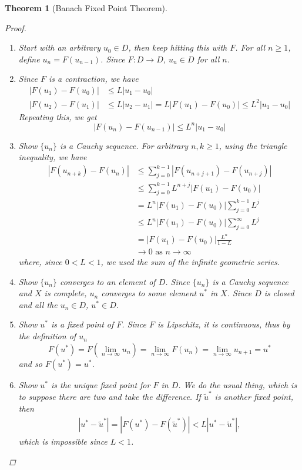 \documentclass{article}
\newtheorem{theorem}{Theorem}[section]
\begin{document}
\begin{theorem}[Banach Fixed Point Theorem]
\begin{proof}
\begin{enumerate}
	\item Start with an arbitrary $u_0 \in D$, then keep hitting this with $F$. For all $n \geq 1$, define $u_n = F(u_{n-1})$. Since $F: D \rightarrow D$, $u_n \in D$ for all $n$.
	\item Since $F$ is a contraction, we have
	\begin{align*}
	|F(u_1) - F(u_0)| &\leq L |u_1 - u_0| \\
	|F(u_2) - F(u_1)| &\leq L |u_2 - u_1| = L|F(u_1) - F(u_0)| \leq L^2 |u_1 - u_0|
	\end{align*}
	Repeating this, we get
	\[
	|F(u_{n}) - F(u_{n-1})| \leq L^n |u_1 - u_0|
	\]
	\item Show $\{ u_n \}$ is a Cauchy sequence. For arbitrary $n, k \geq 1$, using the triangle inequality, we have
	\begin{align*}
	|F(u_{n+k}) - F(u_n)| &\leq \sum_{j=0}^{k-1} |F(u_{n+j+1}) - F(u_{n+j})| \\
	&\leq \sum_{j=0}^{k-1} L^{n+j}|F(u_1) - F(u_0)| \\
	&= L^n |F(u_1) - F(u_0)| \sum_{j=0}^{k-1} L^j \\
	&\leq L^n |F(u_1) - F(u_0)| \sum_{j=0}^{\infty} L^j \\
	&= |F(u_1) - F(u_0)| \frac{L^n}{1 - L} \\
	&\rightarrow 0 \text{ as }n \rightarrow \infty
	\end{align*}
	where, since $0 < L < 1$, we used the sum of the infinite geometric series.
	\item Show $\{ u_n \}$ converges to an element of $D$. Since $\{ u_n \}$ is a Cauchy sequence and $X$ is complete, $u_n$ converges to some element $u^*$ in $X$. Since $D$ is closed and all the $u_n \in D$, $u^* \in D$.
	\item Show $u^*$ is a fixed point of $F$. Since $F$ is Lipschitz, it is continuous, thus by the definition of $u_n$
	\[
	F(u^*) = F(\lim_{n\rightarrow \infty} u_n) = \lim_{n \rightarrow \infty} F(u_n) 
	= \lim_{n \rightarrow \infty} u_{n+1} = u^*
	\]
	and so $F(u^*) = u^*$.
	\item Show $u^*$ is the unique fixed point for $F$ in $D$. We do the usual thing, which is to suppose there are two and take the difference. If $\tilde{u}^*$ is another fixed point, then
	\begin{align*}
	|u^* - \tilde{u}^*| = |F(u^*) - F(\tilde{u}^*)| < L|u^* - \tilde{u}^*|,
	\end{align*}
	which is impossible since $L < 1$.
\end{enumerate}
\end{proof}
\end{theorem}
\end{document}
